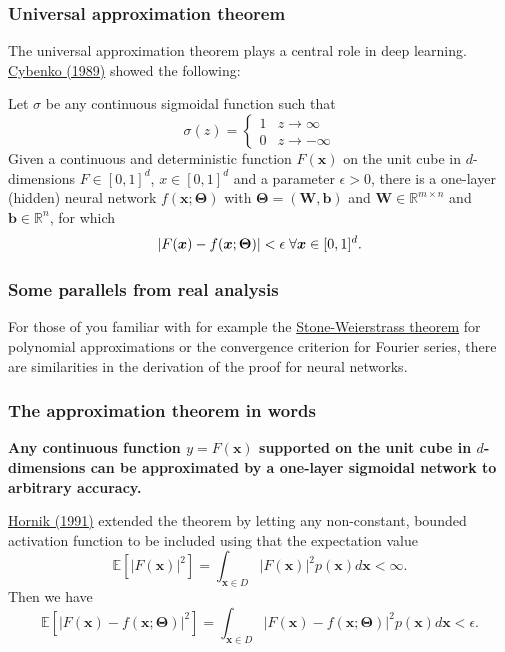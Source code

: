 \documentclass{beamer}
\begin{document}
\begin{frame}
\frametitle{Universal approximation theorem}

The universal approximation theorem plays a central role in deep
learning.  \href{{https://link.springer.com/article/10.1007/BF02551274}}{Cybenko (1989)} showed
the following:

\begin{block}{}
Let $\sigma$ be any continuous sigmoidal function such that
\[
\sigma(z) = \left\{\begin{array}{cc} 1 & z\rightarrow \infty\\ 0 & z \rightarrow -\infty \end{array}\right.
\]
Given a continuous and deterministic function $F(\bm{x})$ on the unit
cube in $d$-dimensions $F\in [0,1]^d$, $x\in [0,1]^d$ and a parameter
$\epsilon >0$, there is a one-layer (hidden) neural network
$f(\bm{x};\bm{\Theta})$ with $\bm{\Theta}=(\bm{W},\bm{b})$ and $\bm{W}\in
\mathbb{R}^{m\times n}$ and $\bm{b}\in \mathbb{R}^{n}$, for which
\[
\vert F(\bm{x})-f(\bm{x};\bm{\Theta})\vert < \epsilon \hspace{0.1cm} \forall \bm{x}\in[0,1]^d.
\]

\end{block}
\end{frame}

\begin{frame}
\frametitle{Some parallels from real analysis}

For those of you familiar with for example the \href{{https://en.wikipedia.org/wiki/Stone%E2%80%93Weierstrass_theorem}}{Stone-Weierstrass
theorem}
for polynomial approximations or the convergence criterion for Fourier
series, there are similarities in the derivation of the proof for
neural networks.
\end{frame}

\begin{frame}
\frametitle{The approximation theorem in words}

\textbf{Any continuous function $y=F(\bm{x})$ supported on the unit cube in
$d$-dimensions can be approximated by a one-layer sigmoidal network to
arbitrary accuracy.}

\href{{https://www.sciencedirect.com/science/article/abs/pii/089360809190009T}}{Hornik (1991)} extended the theorem by letting any non-constant, bounded activation function to be included using that the expectation value
\[
\mathbb{E}[\vert F(\bm{x})\vert^2] =\int_{\bm{x}\in D} \vert F(\bm{x})\vert^2p(\bm{x})d\bm{x} < \infty.
\]
Then we have
\[
\mathbb{E}[\vert F(\bm{x})-f(\bm{x};\bm{\Theta})\vert^2] =\int_{\bm{x}\in D} \vert F(\bm{x})-f(\bm{x};\bm{\Theta})\vert^2p(\bm{x})d\bm{x} < \epsilon.
\]
\end{frame}
\end{document}
